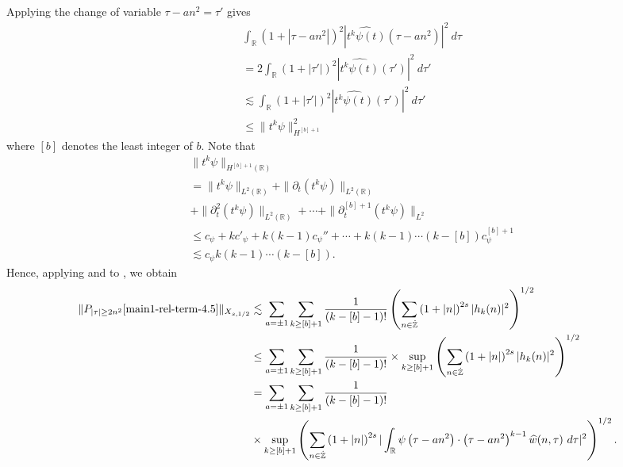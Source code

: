 \documentclass[12pt,reqno]{amsart}
\numberwithin{equation}{section}  %
\renewcommand{\cref}{\Cref}
\newcommand{\rr}{\mathbb{R}}
\newcommand{\zz}{\mathbb{Z}}
\newcommand{\zzdot}{\dot{\zz}}
\newcommand{\wh}{\widehat}
\newcommand{\p}{\partial}
\begin{document}
%
%
Applying the change
of variable $\tau - an^{2} = \tau'$
gives
%
%
\begin{equation}
	\label{3n}
	\begin{split}
		& \int_\rr \left( 1 + | \tau - an^{2} | \right)^{2} | \wh{t^{k}
		\psi(t)}\left( \tau - an^{2} \right) |^2 \ d \tau
    \\
    & = 2 
    \int_\rr \left( 1 + |\tau'| \right)^{2} | \wh{t^k \psi(t)}(\tau') |^2 \
		d \tau'
		\\
    & \lesssim
    \int_\rr \left( 1 + |\tau'| \right)^{2} | \wh{t^k \psi(t)}(\tau')
		|^2 \ d \tau'
		\\
    & \le \| t^{k} \psi \|_{H^{[b] +
  1}}^{2}
\end{split}
\end{equation}
%
%
where $[b]$ denotes the least integer of $b$. Note that
%
%
\begin{equation}
	\label{4n}
	\begin{split}
    & \|t^k \psi \|_{H^{[b] +1}(\rr)}
		\\
    & = \|t^k \psi\|_{L^2(\rr)} + \|\p_t (t^k \psi )
    \|_{L^2(\rr)} 
    \\
    & + \| \p_{t}^{2} (t^{k} \psi) \|_{L^{2}(\rr)} + \cdots + \|
    \p_{t}^{[b] + 1} (t^{k} \psi)\|_{L^{2}}
    \\
    & \le c_{\psi} + k c'_{\psi} + k (k -1) c_{\psi}'' + \cdots +
    k(k-1) \cdots (k - [b]) c_{\psi}^{[b] + 1}
    \\
    & \lesssim c_{\psi} k(k-1) \cdots (k - [b]).
	\end{split}
\end{equation}
%
%
Hence, applying \cref{3n} and \cref{4n} to \cref{2n}, we obtain
%
\begin{equation}
	\label{5n}
	\begin{split}
		\|P_{| \tau | \ge 2n^{2}}\cref{main1-rel-term-4.5} \|_{X_{s,1/2}}
		& \lesssim \sum_{a = \pm 1}
    \sum_{k \ge [b] +1} \frac{1}{(k-[b] - 1)!} \left( \sum_{n \in \zzdot} \left (1 + |n| \right )^{2s} | h_k(n) |^2 
		\right)^{1/2}
		\\
    & \le \sum_{a = \pm 1} \sum_{k \ge [b] +1} \frac{1}{(k-[b] - 1)!}
    \times \sup_{k \ge [b] + 1} \left( \sum_{n \in \zzdot} \left (1 + |n| \right )^{2s} | 
		h_k(n) |^2 \right)^{1/2}
		\\
    & = \sum_{a = \pm 1}\sum_{k \ge [b] +1} \frac{1}{(k-[b] - 1)!}
    \\
    & \times \sup_{k \ge [b] + 1} 
		\left( \sum_{n \in \zzdot} \left (1 + |n| \right )^{2s} |\int_\rr 
		\psi\left( \tau - an^{2} \right) \cdot \left( \tau - an^{2} 
    \right)^{k -1} \wh{w}(n, \tau) \ d \tau|^{2} \right)^{1/2}.
    \end{split}
\end{equation}
\end{document}
